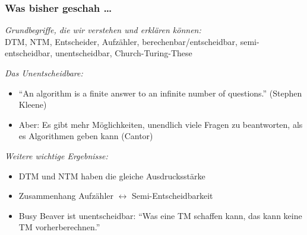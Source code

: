 \documentclass[onlymath]{beamer}
\begin{document}
\maketitle

\begin{frame}\frametitle{Was bisher geschah \ldots}

\emph{Grundbegriffe, die wir verstehen und erklären können:}\\
DTM, NTM, Entscheider, Aufzähler, berechenbar/entscheidbar, semi-entscheidbar, unentscheidbar, Church-Turing-These
\bigskip

\emph{Das Unentscheidbare:}
\begin{itemize}
\item "`An algorithm is a finite answer to an infinite number of questions."' (Stephen Kleene)
\item Aber: Es gibt mehr Möglichkeiten, unendlich viele Fragen zu beantworten, als es Algorithmen geben kann (Cantor)
\end{itemize}

\bigskip
\emph{Weitere wichtige Ergebnisse:}
\begin{itemize}
\item DTM und NTM haben die gleiche Ausdrucksstärke
\item Zusammenhang Aufzähler $\leftrightarrow$ Semi-Entscheidbarkeit
\item Busy Beaver ist unentscheidbar: "`Was eine TM schaffen kann, das kann keine TM vorherberechnen."'
\end{itemize}







\end{frame}

\end{document}
